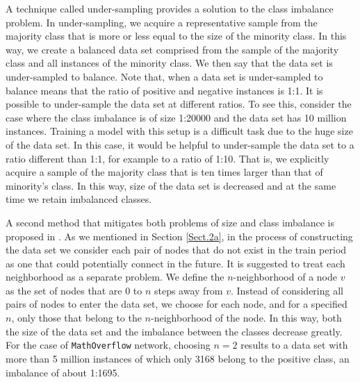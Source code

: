 \documentclass{acm_proc_article-sp}
\begin{document}
A technique called under-sampling provides a solution to the class imbalance problem. In under-sampling, we acquire a representative sample from the majority class that is more or less equal to the size of the minority class. In this way, we create a balanced data set comprised from the sample of the majority class and all instances of the minority class. We then say that the data set is under-sampled to balance. Note that, when a data set is under-sampled to balance means that the ratio of positive and negative instances is 1:1. It is possible to under-sample the data set at different ratios. To see this, consider the case where the class imbalance is of size 1:20000 and the data set has 10 million instances. Training a model with this setup is a difficult task due to the huge size of the data set. In this case, it would be helpful to under-sample the data set to a ratio different than 1:1, for example to a ratio of 1:10. That is, we explicitly acquire a sample of the majority class that is ten times larger than that of minority's class. In this way, size of the data set is decreased and at the same time we retain imbalanced classes.


A second method that mitigates both problems of size and class imbalance is proposed in \cite{Lichtenwalter:2010:NPM:1835804.1835837}. As we mentioned in Section \ref{Sect.2a}, in the process of constructing the data set we consider each pair of nodes that do not exist in the train period as one that could potentially connect in the future. It is suggested to treat each neighborhood as a separate problem. We define the $n$-neighborhood of a node $v$ as the set of nodes that are 0 to $n$ steps away from $v$. Instead of considering all pairs of nodes to enter the data set, we choose for each node, and for a specified $n$, only those that belong to the $n$-neighborhood of the node. In this way, both the size of the data set and the imbalance between the classes decrease greatly. For the case of \texttt{MathOverflow} network, choosing $n=2$ results to a data set with more than 5 million instances of which only 3168 belong to the positive class, an imbalance of about 1:1695.
\end{document}
